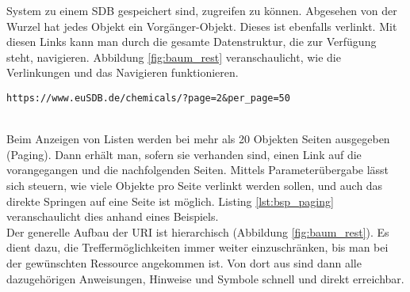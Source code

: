 System zu einem \ac{SDB} gespeichert sind, zugreifen zu können. Abgesehen von
der Wurzel hat jedes Objekt ein Vorgänger-Objekt. Dieses ist ebenfalls verlinkt.
Mit diesen Links kann man durch die gesamte Datenstruktur, die zur Verfügung
steht, navigieren. Abbildung \ref{fig:baum_rest} veranschaulicht, wie die
Verlinkungen und das Navigieren funktionieren.
\begin{lstlisting}[caption={Beispielrequest zur
Steuerung des Paging (Seite 2 mit 50 Einträgen)}, label=lst:bsp_paging,
captionpos=b] 
https://www.euSDB.de/chemicals/?page=2&per_page=50
\end{lstlisting}
\\
Beim Anzeigen von Listen werden bei mehr als 20 Objekten Seiten
ausgegeben (Paging). Dann erhält man, sofern sie verhanden sind, einen
Link auf die vorangegangen und die nachfolgenden Seiten. Mittels
Parameterübergabe lässt sich steuern, wie viele Objekte pro Seite verlinkt werden sollen, und auch das
direkte Springen auf eine Seite ist möglich. Listing \ref{lst:bsp_paging}
veranschaulicht dies anhand eines Beispiels.
\\
Der generelle Aufbau der \ac{URI} ist hierarchisch (Abbildung
\ref{fig:baum_rest}). Es dient dazu, die Treffermöglichkeiten immer weiter
einzuschränken, bis man bei der gewünschten Ressource angekommen ist. Von dort
aus sind dann alle dazugehörigen Anweisungen, Hinweise und Symbole schnell und
direkt erreichbar.

